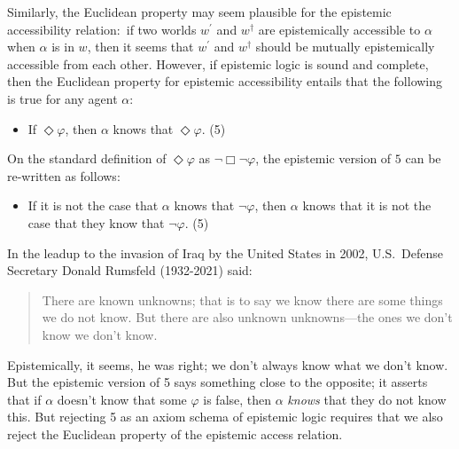 \documentclass[11pt]{article}
\theoremstyle{definition}
\theoremstyle{remark}
\begin{document}
Similarly, the Euclidean property may seem plausible for the epistemic accessibility relation:\ if two worlds $w^{\prime}$ and $w^{\dagger}$ are epistemically accessible to $\alpha$ when $\alpha$ is in $w$, then it seems that $w^{\prime}$ and $w^{\dagger}$ should be mutually epistemically accessible from each other. However, if epistemic logic is sound and complete, then the Euclidean property for epistemic accessibility entails that the following is true for any agent $\alpha$:
\begin{itemize}
    \item If $\Diamond\varphi$, then $\alpha$ knows that $\Diamond \varphi$. (5)
\end{itemize}
On the standard definition of $\Diamond \varphi$ as $\neg\Box \neg \varphi$, the epistemic version of $5$ can be re-written as follows:
\begin{itemize}
    \item If it is not the case that $\alpha$ knows that $\neg\varphi$, then $\alpha$ knows that it is not the case that they know that $\neg\varphi$. (5)
\end{itemize}
In the leadup to the invasion of Iraq by the United States in 2002, U.S.\ Defense Secretary Donald Rumsfeld (1932-2021) said:
\begin{quote}
    There are known unknowns; that is to say we know there are some things we do not know. But there are also unknown unknowns—the ones we don't know we don't know.
\end{quote}
Epistemically, it seems, he was right; we don't always know what we don't know. But the epistemic version of 5 says something close to the opposite; it asserts that if $\alpha$ doesn't know that some $\varphi$ is false, then $\alpha$ \textit{knows} that they do not know this. But rejecting 5 as an axiom schema of epistemic logic requires that we also reject the Euclidean property of the epistemic access relation.\par 
\end{document}
